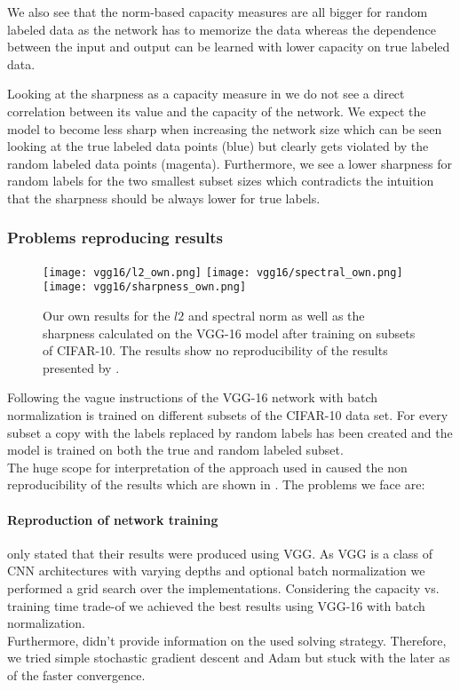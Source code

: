 We also see that the norm-based capacity measures are all bigger for random labeled data as the network has to memorize the data whereas the dependence between the input and output can be learned with lower capacity on true labeled data. \par
%
Looking at the sharpness as a capacity measure in  we do not see a direct correlation between its value and the capacity of the network. We expect the model to become less sharp when increasing the network size which can be seen looking at the true labeled data points (blue) but clearly gets violated by the random labeled data points (magenta). Furthermore, we see a lower sharpness for random labels for the two smallest subset sizes which contradicts the intuition that the sharpness should be always lower for true labels. 
%
\subsubsection{Problems reproducing results}
\label{sec:problems-subset-sizes}
\begin{figure}[h]
	\centering
	\texttt{[image: vgg16/l2\_own.png]}
	\texttt{[image: vgg16/spectral\_own.png]}
	\texttt{[image: vgg16/sharpness\_own.png]}
	\caption{Our own results for the $l2$ and spectral norm as well as the sharpness calculated on the VGG-16 model after training on subsets of CIFAR-10. The results show no reproducibility of the results presented by \cite{neyshabur2017exploring}.}	
	\label{fig:norms-own}
\end{figure}
Following the vague instructions of \cite{neyshabur2017exploring} the VGG-16 network with batch normalization  is trained on different subsets of the CIFAR-10  data set. For every subset a copy with the labels replaced by random labels has been created and the model is trained on both the true and random labeled subset. \\
%
The huge scope for interpretation of the approach used in \cite{neyshabur2017exploring} caused the non reproducibility of the results which are shown in . The problems we face are:
%
\paragraph{Reproduction of network training}
\label{sec:problems-reproduction-training}
\ns{} only stated that their results were produced using VGG. As VGG is a class of CNN architectures with varying depths and optional batch normalization we performed a grid search over the implementations. Considering the capacity vs. training time trade-of we achieved the best results using VGG-16 with batch normalization.\\
Furthermore, \cite{neyshabur2017exploring} didn't provide information on the used solving strategy. Therefore, we tried simple stochastic gradient descent and Adam but stuck with the later as of the faster convergence.
%
